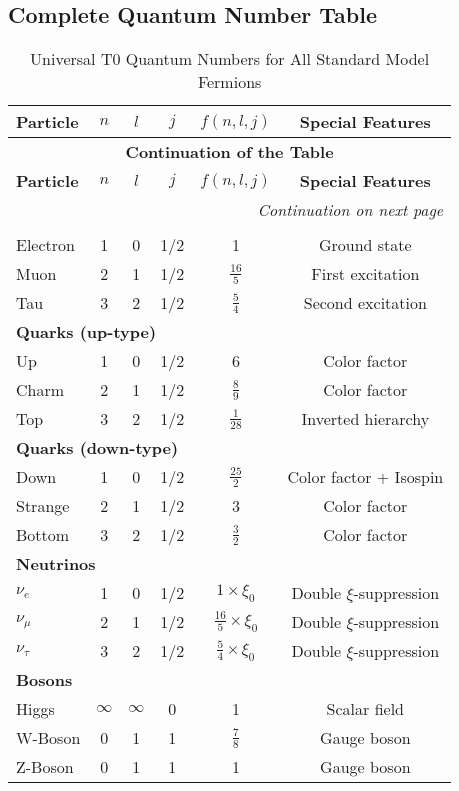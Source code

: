 \documentclass[12pt,a4paper]{article}
\begin{document}
	\subsection{Complete Quantum Number Table}
	
	\begin{longtable}{lccccc}
		\caption{Universal T0 Quantum Numbers for All Standard Model Fermions} \\
		\toprule
		\textbf{Particle} & \textbf{$n$} & \textbf{$l$} & \textbf{$j$} & \textbf{$f(n,l,j)$} & \textbf{Special Features} \\
		\midrule
		\endfirsthead
		
		\multicolumn{6}{c}{{\bfseries Continuation of the Table}} \\
		\toprule
		\textbf{Particle} & \textbf{$n$} & \textbf{$l$} & \textbf{$j$} & \textbf{$f(n,l,j)$} & \textbf{Special Features} \\
		\midrule
		\endhead
		
		\midrule
		\multicolumn{6}{r}{\textit{Continuation on next page}} \\
		\endfoot
		
		\bottomrule
		\endlastfoot
		
		\multicolumn{6}{l}{\textbf{Charged Leptons}} \\
		\midrule
		Electron & 1 & 0 & 1/2 & 1 & Ground state \\
		Muon & 2 & 1 & 1/2 & $\frac{16}{5}$ & First excitation \\
		Tau & 3 & 2 & 1/2 & $\frac{5}{4}$ & Second excitation \\
		\midrule
		\multicolumn{6}{l}{\textbf{Quarks (up-type)}} \\
		\midrule
		Up & 1 & 0 & 1/2 & 6 & Color factor \\
		Charm & 2 & 1 & 1/2 & $\frac{8}{9}$ & Color factor \\
		Top & 3 & 2 & 1/2 & $\frac{1}{28}$ & Inverted hierarchy \\
		\midrule
		\multicolumn{6}{l}{\textbf{Quarks (down-type)}} \\
		\midrule
		Down & 1 & 0 & 1/2 & $\frac{25}{2}$ & Color factor + Isospin \\
		Strange & 2 & 1 & 1/2 & 3 & Color factor \\
		Bottom & 3 & 2 & 1/2 & $\frac{3}{2}$ & Color factor \\
		\midrule
		\multicolumn{6}{l}{\textbf{Neutrinos}} \\
		\midrule
		$\nu_e$ & 1 & 0 & 1/2 & $1 \times \xi_0$ & Double $\xi$-suppression \\
		$\nu_\mu$ & 2 & 1 & 1/2 & $\frac{16}{5} \times \xi_0$ & Double $\xi$-suppression \\
		$\nu_\tau$ & 3 & 2 & 1/2 & $\frac{5}{4} \times \xi_0$ & Double $\xi$-suppression \\
		\midrule
		\multicolumn{6}{l}{\textbf{Bosons}} \\
		\midrule
		Higgs & $\infty$ & $\infty$ & 0 & 1 & Scalar field \\
		W-Boson & 0 & 1 & 1 & $\frac{7}{8}$ & Gauge boson \\
		Z-Boson & 0 & 1 & 1 & 1 & Gauge boson \\
		\bottomrule
	\end{longtable}
	
\end{document}
